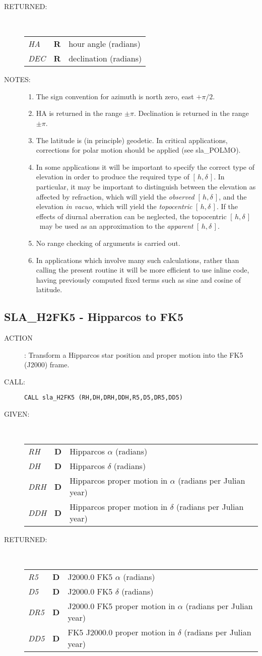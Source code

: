 \documentclass[11pt,twoside]{article}
\newcommand{\xlabel}[1]{}
\newcommand{\hadec}     {$[\,h,\delta\,]$}
\newcommand{\routine}[3]
{\hbadness=10000
  \vbox
  {
    \rule{\textwidth}{0.3mm}\\
    {\Large {\bf #1} \hfill #2 \hfill {\bf #1}}\\
    \setlength{\oldspacing}{\topsep}
    \setlength{\topsep}{0.3ex}
    \begin{description}
      #3
    \end{description}
    \setlength{\topsep}{\oldspacing}
  }
}
\renewcommand{\routine}[3]
   {
      \subsection{#1\xlabel{#1} - #2\label{#1}}
       \begin{description}
         #3
       \end{description}
   }
\newcommand{\action}[1]
{\item[ACTION]: #1}
\newcommand{\action}[1]
   {\item[ACTION:] #1}
\newcommand{\call}[1]
{\item[CALL]: \hspace{0.4em}{\tt #1}}
\newlength{\oldspacing}
\renewcommand{\call}[1]
   {
    \item[CALL:] {\tt #1}
   }
\newcommand{\args}[2]
{
  \goodbreak
  \setlength{\oldspacing}{\topsep}
  \setlength{\topsep}{0.3ex}
  \begin{description}
  \item[#1]:\\[1.5ex]
    \begin{tabular}{p{7em}p{6em}p{22em}}
      #2
    \end{tabular}
  \end{description}
  \setlength{\topsep}{\oldspacing}
}
\renewcommand{\args}[2]
   {
     \begin{description}
        \item[#1:]\\
        \begin{tabular}{p{7em}p{6em}l}
           #2
        \end{tabular}
     \end{description}
   }
\newcommand{\spec}[3]
{
  {\em {#1}} & {\bf \mbox{#2}} & {#3}
}
\newcommand{\notes}[1]
{
  \goodbreak
  \setlength{\oldspacing}{\topsep}
  \setlength{\topsep}{0.3ex}
  \begin{description}
    \item[NOTES]:
        #1
  \end{description}
  \setlength{\topsep}{\oldspacing}
}
\renewcommand{\notes}[1]
   {
      \begin{description}
         \item[NOTES:]
            #1
      \end{description}
   }
\begin{document}
\args{RETURNED}
{
 \spec{HA}{R}{hour angle (radians)} \\
 \spec{DEC}{R}{declination (radians)}
}
\notes
{
 \begin{enumerate}
  \item The sign convention for azimuth is north zero, east $+\pi/2$.
  \item HA is returned in the range $\pm\pi$.  Declination is returned
        in the range $\pm\pi$.
  \item The latitude is (in principle) geodetic.  In critical
        applications, corrections for polar motion should be applied
        (see sla\_POLMO).
  \item In some applications it will be important to specify the
        correct type of elevation in order to produce the required
        type of \hadec.  In particular, it may be important to
        distinguish between the elevation as affected by refraction,
        which will yield the {\it observed} \hadec, and the elevation
        {\it in vacuo}, which will yield the {\it topocentric}
        \hadec.  If the
        effects of diurnal aberration can be neglected, the
        topocentric \hadec\ may be used as an approximation to the
        {\it apparent} \hadec.
  \item No range checking of arguments is carried out.
  \item In applications which involve many such calculations, rather
        than calling the present routine it will be more efficient to
        use inline code, having previously computed fixed terms such
        as sine and cosine of latitude.
 \end{enumerate}
}
\routine{SLA\_H2FK5}{Hipparcos to FK5}
{
 \action{Transform a Hipparcos star position and proper motion
         into the FK5 (J2000) frame.}
 \call{CALL sla\_H2FK5 (RH,DH,DRH,DDH,R5,D5,DR5,DD5)}
}
\args{GIVEN}
{
 \spec{RH}{D}{Hipparcos $\alpha$ (radians)} \\
 \spec{DH}{D}{Hipparcos $\delta$ (radians)} \\
 \spec{DRH}{D}{Hipparcos proper motion in $\alpha$
                              (radians per Julian year)} \\
 \spec{DDH}{D}{Hipparcos proper motion in $\delta$
                              (radians per Julian year)}
}
\args{RETURNED}
{
 \spec{R5}{D}{J2000.0 FK5 $\alpha$ (radians)} \\
 \spec{D5}{D}{J2000.0 FK5 $\delta$ (radians)} \\
 \spec{DR5}{D}{J2000.0 FK5 proper motion in $\alpha$
                              (radians per Julian year)} \\
 \spec{DD5}{D}{FK5 J2000.0 proper motion in $\delta$
                              (radians per Julian year)}
}
\end{document}
